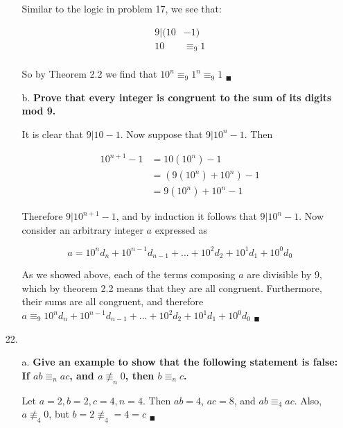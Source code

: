 \documentclass{article}
\begin{document}
\begin{enumerate}
\begin{enumerate}
					Similar to the logic in problem 17, we see that:

						\begin{align*}
							9 | (10 & - 1) \\
							10 & \equiv_9 1 \\
						\end{align*}

					So by Theorem 2.2 we find that $10^n \equiv_9 1^n \equiv_9 1$ 
					$_{\blacksquare}$

				\item [b.]	\textbf{Prove that every integer is congruent to the sum of its digits
							mod 9.}		

					It is clear that $9 | 10 - 1$. Now suppose that $9 | 10^n - 1$. Then 

						\begin{align*}
							10^{n + 1} - 1 & = 10(10^n) - 1 \\
								&= (9(10^n) + 10^n) - 1 \\
								&= 9(10^n) + 10^n - 1
						\end{align*}

					Therefore $9 | 10^{n+1} - 1$, and by induction it follows that $9 | 10^n -1$.
					Now consider an arbitrary integer $a$ expressed as

					\begin{equation*}
						a = 10^nd_n + 10^{n-1}d_{n-1} + ... + 10^2d_2 + 10^1d_1 + 10^0d_0
					\end{equation*}

					As we showed above, each of the terms composing $a$ are divisible by 9, which 
					by theorem 2.2 means that they are all congruent. Furthermore, their sums are
					all congruent, and therefore $a \equiv_9 10^nd_n + 10^{n-1}d_{n-1} + ... + 
					10^2d_2 + 10^1d_1 + 10^0d_0$ $_{\blacksquare}$

			\end{enumerate}
		\item [22.]	
			\begin{enumerate}
				\item [a.]	\textbf{Give an example to show that the following statement is false:
							If $ab \equiv_n ac$, and $a \not\equiv_n 0$, then $b \equiv_n c$.}

					Let $a = 2, b = 2, c = 4, n = 4$. Then $ab = 4$, $ac = 8$, and $ab \equiv_4 ac$.
					Also, $a \not\equiv_4 0$, but $b = 2 \not\equiv_4 = 4 = c$ $_{\blacksquare}$


\end{enumerate}
\end{enumerate}
\end{document}
